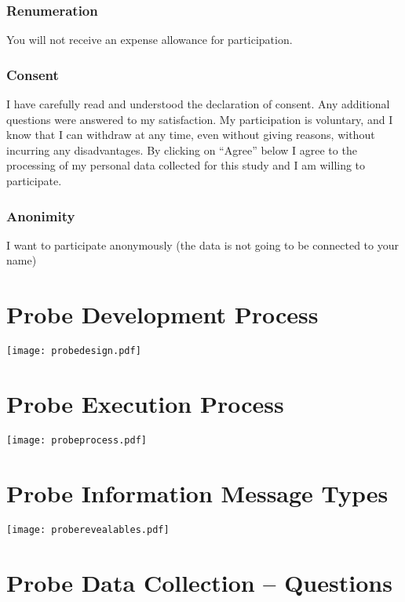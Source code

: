 \begin{appendices}
  \subsubsection*{Renumeration}

  You will not receive an expense allowance for participation.

  \subsubsection*{Consent}

  I have carefully read and understood the declaration of consent. Any additional questions were answered to my satisfaction. My participation is voluntary, and I know that I can withdraw at any time, even without giving reasons, without incurring any disadvantages. By clicking on “Agree” below I agree to the processing of my personal data collected for this study and I am willing to participate.

  \subsubsection*{Anonimity}

  I want to participate anonymously (the data is not going to be connected to your name)

  \section{Probe Development Process}
  \label{append:probe-design}

  \texttt{[image: probedesign.pdf]}

  \section{Probe Execution Process}
  \label{append:probe-exec}

  \texttt{[image: probeprocess.pdf]}

  \section{Probe Information Message Types}
  \label{append:probe-types}

  \texttt{[image: proberevealables.pdf]}

  \section{Probe Data Collection -- Questions}
  \label{append:collect}


\end{appendices}
